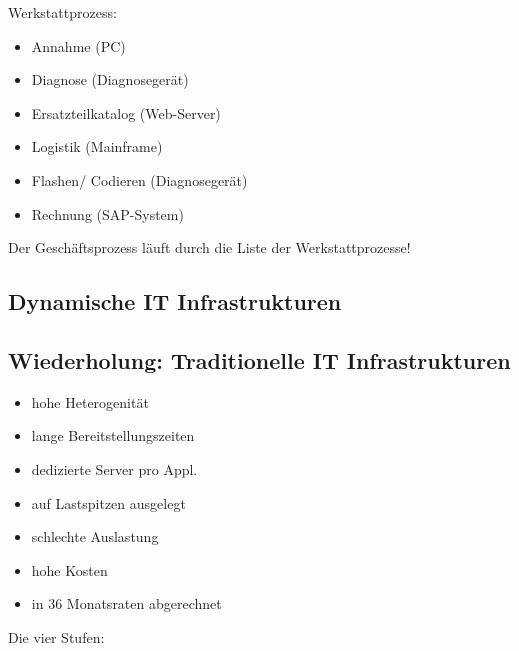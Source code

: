\documentclass[a4paper]{article}
\begin{document}


Werkstattprozess:

\begin{itemize}
    \item Annahme (PC)
    \item Diagnose (Diagnosegerät)
    \item Ersatzteilkatalog (Web-Server)
    \item Logistik (Mainframe)
    \item Flashen/ Codieren (Diagnosegerät)
    \item Rechnung (SAP-System)
\end{itemize}

Der Geschäftsprozess läuft durch die Liste der Werkstattprozesse!


\subsection{Dynamische IT Infrastrukturen}



\subsection{Wiederholung: Traditionelle IT Infrastrukturen}

\begin{itemize}
    \item hohe Heterogenität
    \item lange Bereitstellungszeiten
    \item dedizierte Server pro Appl.
    \item auf Lastspitzen ausgelegt
    \item schlechte Auslastung
    \item hohe Kosten
    \item in 36 Monatsraten abgerechnet
\end{itemize}

Die vier Stufen:
\end{document}
